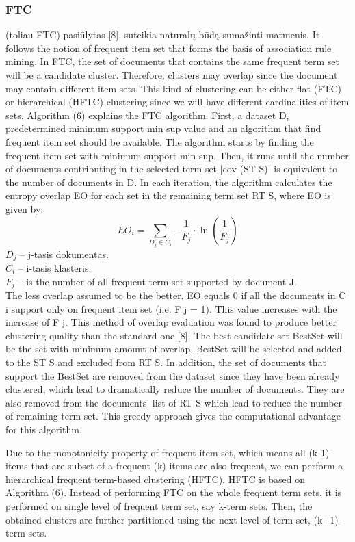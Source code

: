\documentclass{VUMIFInfKursinis}
\begin{document}
\subsubsection{FTC}
 (toliau FTC) pasiūlytas [8], suteikia naturalų būdą sumažinti matmenis.
It follows the notion of frequent item set that forms the basis of association rule mining. In FTC, the set of documents that contains the same frequent term set will be a candidate cluster. Therefore, clusters may overlap since the document may contain different item sets. This kind of clustering can be either flat (FTC) or hierarchical (HFTC) clustering since we will have different cardinalities of item sets.
Algorithm (6) explains the FTC algorithm. First, a dataset D, predetermined minimum support min sup value and an algorithm that find frequent item set should be available. The algorithm starts by finding the frequent item set with minimum support min sup. Then, it runs until the number of documents contributing in the selected term set |cov (ST S)| is equivalent to the number of documents in D. In each iteration, the algorithm calculates the entropy overlap EO for each set in the remaining term set RT S, where EO is given by:
\begin{equation}
	EO_i=\sum_{D_j \in C_i}{-\frac{1}{F_j}\cdot\ln(\frac{1}{F_j})}
\end{equation} 
$D_j$ – j-tasis dokumentas.\\
$C_i$ – i-tasis klasteris.\\
$F_j$ – is the number of all frequent term set supported by document J.\\
The less overlap assumed to be the better. EO equals 0 if all the documents in C i support only on frequent item set (i.e. F j = 1). This value increases with the increase of F j. This method of overlap evaluation was found to produce better clustering quality than the standard one [8]. The best candidate set BestSet will be the set with minimum amount of overlap. BestSet will be selected and added to the ST S and excluded from RT S. In addition, the set of documents that support the BestSet are removed from the dataset since they have been already clustered, which lead to dramatically reduce the number of documents. They are also removed from the documents’ list of RT S which lead to reduce the number of remaining term set. This greedy approach gives the computational advantage for this algorithm.

Due to the monotonicity property of frequent item set, which means all (k-1)-items that are subset of a frequent (k)-items are also frequent, we can perform a hierarchical frequent term-based clustering (HFTC). HFTC is based on Algorithm (6). Instead of performing FTC on the whole frequent term sets, it is performed on single level of frequent term set, say k-term sets. Then, the obtained clusters are further partitioned using the next level of term set, (k+1)-term sets.
\end{document}
